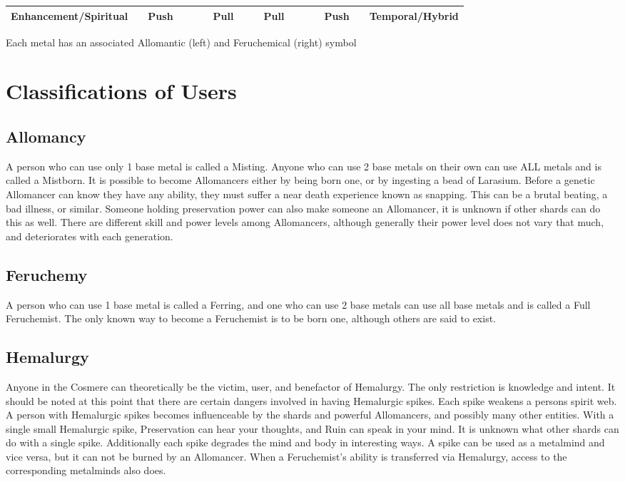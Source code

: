 \documentclass[conference]{IEEEtran}
\begin{document}
\begin{table}[!hb]
\begin{tabular}{ |l |ccc c ccc | ccc c ccc | r| }
		Enhancement/Spiritual&&Push&&&&Pull&&&Pull&&&&Push&&Temporal/Hybrid\\\hline
	\end{tabular}
\vspace{0.5em}\break
Each metal has an associated Allomantic (left) and Feruchemical (right) symbol
	\label{metals}
\end{table}
\hfill
\section*{Classifications of Users}

\subsection*{Allomancy}
A person who can use only 1 base metal is called a Misting.  Anyone who can use 2 base metals on their own can use ALL metals and is called a Mistborn.  It is possible to become Allomancers either by being born one, or by ingesting a bead of Larasium.  Before a genetic Allomancer can know they have any ability, they must suffer a near death experience known as snapping.  This can be a brutal beating, a bad illness, or similar.  Someone holding preservation power can also make someone an Allomancer, it is unknown if other shards can do this as well.  There are different skill and power levels among Allomancers, although generally their power level does not vary that much, and deteriorates with each generation.  
\subsection*{Feruchemy}
A person who can use 1 base metal is called a Ferring, and one who can use 2 base metals can use all base metals and is called a Full Feruchemist.  The only known way to become a Feruchemist is to be born one, although others are said to exist.

\subsection*{Hemalurgy}
Anyone in the Cosmere can theoretically be the victim, user, and benefactor of Hemalurgy.  The only restriction is knowledge and intent.
It should be noted at this point that there are certain dangers involved in having Hemalurgic spikes.  Each spike weakens a persons spirit web.  A person with Hemalurgic spikes becomes influenceable  by the shards and powerful Allomancers, and possibly many other entities.
With a single small Hemalurgic spike, Preservation can hear your thoughts, and Ruin can speak in your mind.  It is unknown what other shards can do with a single spike.
Additionally each spike degrades the mind and body in interesting ways.  
A spike can be used as a metalmind and vice versa, but it can not be burned by an Allomancer.
When a Feruchemist's ability is transferred via Hemalurgy, access to the corresponding metalminds also does.
\end{document}
